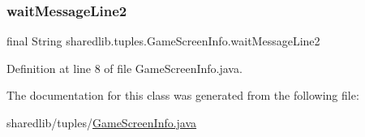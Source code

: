 \subsubsection{\texorpdfstring{wait\+Message\+Line2}{waitMessageLine2}}
{\footnotesize\ttfamily final String sharedlib.\+tuples.\+Game\+Screen\+Info.\+wait\+Message\+Line2}



Definition at line 8 of file Game\+Screen\+Info.\+java.



The documentation for this class was generated from the following file\+:\begin{DoxyCompactItemize}
\item 
sharedlib/tuples/\hyperlink{_game_screen_info_8java}{Game\+Screen\+Info.\+java}\end{DoxyCompactItemize}
